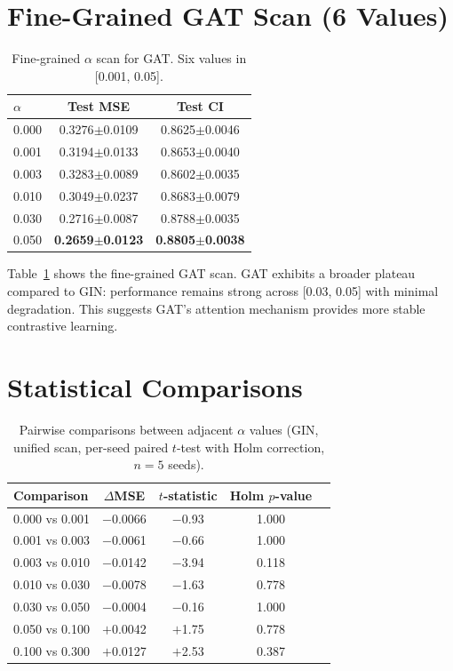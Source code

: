 \documentclass[10pt,a4paper]{article}
\begin{document}
\section{Fine-Grained GAT Scan (6 Values)}

\begin{table}[!h]
\caption{Fine-grained $\alpha$ scan for GAT. Six values in [0.001, 0.05].}
\label{tab:alpha_fine_gat}
\centering
\begin{tabular}{lcc}
\toprule
$\alpha$ & Test MSE & Test CI \\
\midrule
0.000 & 0.3276$\pm$0.0109 & 0.8625$\pm$0.0046 \\
0.001 & 0.3194$\pm$0.0133 & 0.8653$\pm$0.0040 \\
0.003 & 0.3283$\pm$0.0089 & 0.8602$\pm$0.0035 \\
0.010 & 0.3049$\pm$0.0237 & 0.8683$\pm$0.0079 \\
0.030 & 0.2716$\pm$0.0087 & 0.8788$\pm$0.0035 \\
0.050 & \textbf{0.2659$\pm$0.0123} & \textbf{0.8805$\pm$0.0038} \\
\bottomrule
\end{tabular}
\end{table}

Table~\ref{tab:alpha_fine_gat} shows the fine-grained GAT scan. GAT exhibits a broader plateau compared to GIN: performance remains strong across [0.03, 0.05] with minimal degradation. This suggests GAT's attention mechanism provides more stable contrastive learning.

\section{Statistical Comparisons}

\begin{table}[!h]
\caption{Pairwise comparisons between adjacent $\alpha$ values (GIN, unified scan, per-seed paired $t$-test with Holm correction, $n=5$ seeds).}
\label{tab:alpha_stats_gin}
\centering
\begin{tabular}{lcccc}
\toprule
Comparison & $\Delta$MSE & $t$-statistic & Holm $p$-value \\
\midrule
0.000 vs 0.001 & $-$0.0066 & $-$0.93 & 1.000 \\
0.001 vs 0.003 & $-$0.0061 & $-$0.66 & 1.000 \\
0.003 vs 0.010 & $-$0.0142 & $-$3.94 & 0.118 \\
0.010 vs 0.030 & $-$0.0078 & $-$1.63 & 0.778 \\
0.030 vs 0.050 & $-$0.0004 & $-$0.16 & 1.000 \\
0.050 vs 0.100 & $+$0.0042 & $+$1.75 & 0.778 \\
0.100 vs 0.300 & $+$0.0127 & $+$2.53 & 0.387 \\
\bottomrule
\end{tabular}
\end{table}
\end{document}
